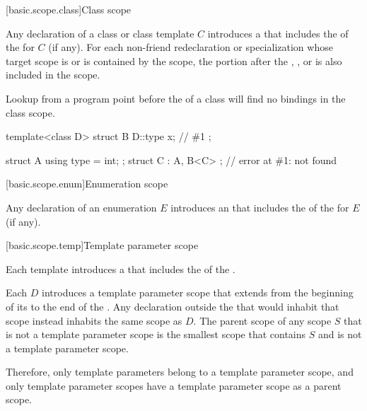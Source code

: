 [basic.scope.class]{Class scope}

\pnum
Any declaration of a class or class template $C$ introduces
a 
that includes the  of
the  for $C$ (if any).
For each non-friend redeclaration or specialization
whose target scope is or is contained by the scope,
the portion after the
,
, or
 is also included in the scope.
\begin{note}
Lookup from a program point
before the  of a class
will find no bindings in the class scope.
\begin{example}
\begin{codeblock}
template<class D>
struct B {
  D::type x;            // \#1
};

struct A { using type = int; };
struct C : A, B<C> {};  // error at \#1:  not found
\end{codeblock}
\end{example}
\end{note}

[basic.scope.enum]{Enumeration scope}%

\pnum
Any declaration of an enumeration $E$ introduces
an 
that includes the  of
the  for $E$ (if any).

[basic.scope.temp]{Template parameter scope}%

\pnum
Each template  introduces
a 
that includes the  of
the .

\pnum
Each  $D$ introduces
a template parameter scope
that extends from the beginning of its 
to the end of the .
Any declaration outside the 
that would inhabit that scope instead inhabits the same scope as $D$.
The parent scope of any scope $S$ that is not a template parameter scope
is the smallest scope that contains $S$ and is not a template parameter scope.
\begin{note}
Therefore, only template parameters belong to a template parameter scope, and
only template parameter scopes have
a template parameter scope as a parent scope.
\end{note}

